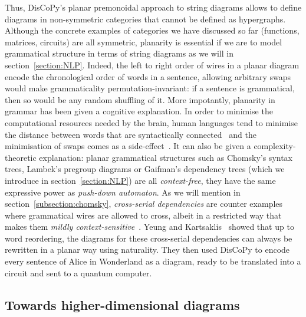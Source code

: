 Thus, DisCoPy's planar premonoidal approach to string diagrams allows to define diagrams in non-symmetric categories that cannot be defined as hypergraphs.
Although the concrete examples of categories we have discussed so far (functions, matrices, circuits) are all symmetric, planarity is essential if we are to model grammatical structure in terms of string diagrams as we will in section~\ref{section:NLP}.
Indeed, the left to right order of wires in a planar diagram encode the chronological order of words in a sentence, allowing arbitrary swaps would make grammaticality permutation-invariant: if a sentence is grammatical, then so would be any random shuffling of it.
More impotantly, planarity in grammar has been given a cognitive explanation.
In order to minimise the computational resources needed by the brain, human languages tend to minimise the distance between words that are syntactically connected~\cite{FutrellEtAl15} and the minimisation of swaps comes as a side-effect~\cite{Cancho06}.
It can also be given a complexity-theoretic explanation: planar grammatical structures such as Chomsky's syntax trees, Lambek's pregroup diagrams or Gaifman's dependency trees (which we introduce in section~\ref{section:NLP}) are all \emph{context-free}, they have the same expressive power as \emph{push-down automaton}.
As we will mention in section~\ref{subsection:chomsky}, \emph{cross-serial dependencies} are counter examples where grammatical wires are allowed to cross, albeit in a restricted way that makes them \emph{mildly context-sensitive}~\cite{Stabler04}.
Yeung and Kartsaklis~\cite{YeungKartsaklis21} showed that up to word reordering, the diagrams for these cross-serial dependencies can always be rewritten in a planar way using naturality.
They then used DisCoPy to encode every sentence of Alice in Wonderland as a diagram, ready to be translated into a circuit and sent to a quantum computer.

\subsection{Towards higher-dimensional diagrams}\label{subsection:towards-higher}

